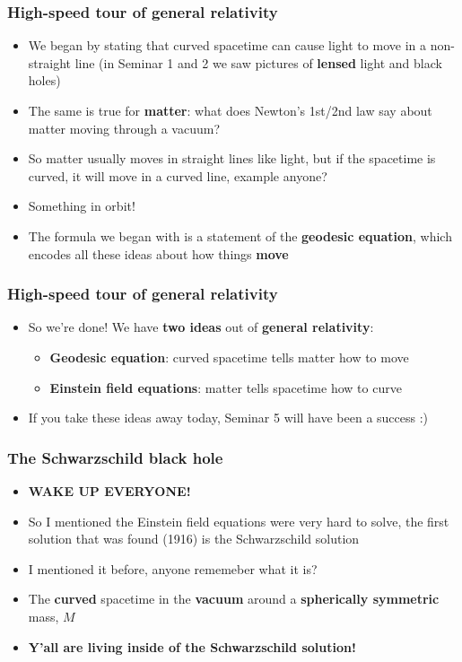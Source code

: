 \documentclass{beamer}
\begin{document}
\begin{frame}
  \frametitle{High-speed tour of general relativity}
  \begin{itemize}
    \item<1-> We began by stating that curved spacetime can cause light to move in a non-straight line (in Seminar 1 and 2 we saw pictures of \textbf{lensed} light and black holes)
    \item<2-> The same is true for \textbf{matter}: what does Newton's 1st/2nd law say about matter moving through a vacuum?
    \item<3-> So matter usually moves in straight lines like light, but if the spacetime is curved, it will move in a curved line, example anyone?
    \item<4-> Something in orbit!
    \item<5-> The formula we began with is a statement of the \textbf{geodesic equation}, which encodes all these ideas about how things \textbf{move}
  \end{itemize}
\end{frame}

\begin{frame}
  \frametitle{High-speed tour of general relativity}
  \begin{itemize}
    \item<1-> So we're done! We have \textbf{two ideas} out of \textbf{general relativity}:
      \begin{itemize}
	\item \textbf{Geodesic equation}: curved spacetime tells matter how to move
	\item \textbf{Einstein field equations}: matter tells spacetime how to curve
      \end{itemize}
    \item<2-> If you take these ideas away today, Seminar 5 will have been a success :)
  \end{itemize}
\end{frame}

\begin{frame}
  \frametitle{The Schwarzschild black hole}
  \begin{itemize}
    \item<1-> \textbf{WAKE UP EVERYONE!}
    \item<2-> So I mentioned the Einstein field equations were very hard to solve, the first solution that was found (1916) is the Schwarzschild solution
    \item<3-> I mentioned it before, anyone rememeber what it is?
    \item<4-> The \textbf{curved} spacetime in the \textbf{vacuum} around a \textbf{spherically symmetric} mass, $M$
    \item<5-> \textbf{Y'all are living inside of the Schwarzschild solution!}
  \end{itemize}
\end{frame}
\end{document}
